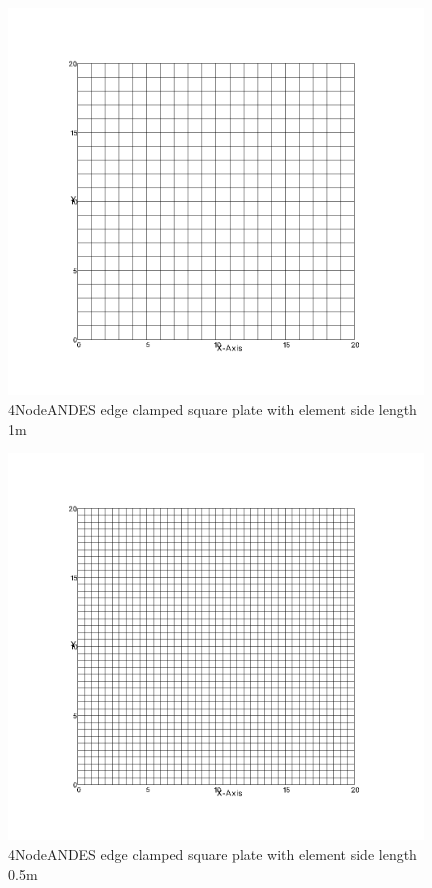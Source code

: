 \documentclass[fleqn,11pt,letter]{article}
\begin{document}
\newpage

\begin{figure}[H]
  \centering
  \includegraphics[width=11cm]{../Figure_files/4NodeANDES/square_plate4.png}
  \caption{4NodeANDES edge clamped square plate with element side length 1m }
  \label{fig 4NodeANDES edges clamped square plate with element side length 1m }
\end{figure}


\begin{figure}[H]
  \centering
  \includegraphics[width=11cm]{../Figure_files/4NodeANDES/square_plate5.png}
  \caption{4NodeANDES edge clamped square plate with element side length 0.5m }
  \label{fig 4NodeANDES edges clamped square plate with element side length 0.5m }
\end{figure}
\end{document}
